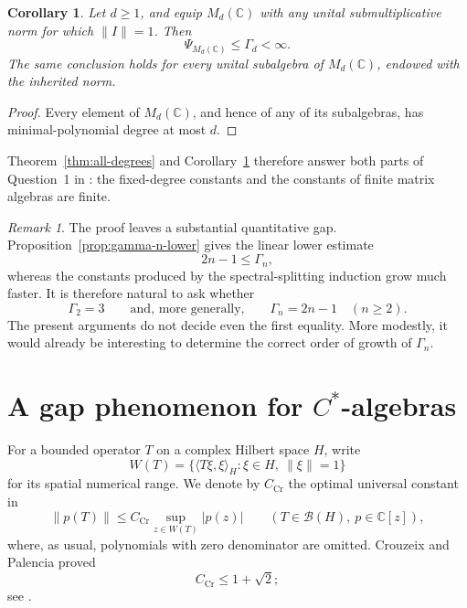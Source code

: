 \documentclass[a4paper]{amsart}
\newtheorem{corollary}[theorem]{Corollary}
\theoremstyle{remark}
\newtheorem{remark}[theorem]{Remark}
\newcommand{\C}{\mathbb C}
\newcommand{\calB}{\mathcal B}
\begin{document}
\begin{corollary}\label{cor:matrix-algebras}
Let \(d\geqslant1\), and equip \(M_d(\C)\) with any unital submultiplicative norm for which \(\|I\|=1\).  Then
\[
       \Psi_{M_d(\C)}\leqslant\Gamma_d<\infty.
\]
The same conclusion holds for every unital subalgebra of \(M_d(\C)\),
endowed with the inherited norm.
\end{corollary}

\begin{proof}
Every element of \(M_d(\C)\), and hence of any of its subalgebras, has minimal-polynomial degree at most \(d\).
\end{proof}

Theorem~\ref{thm:all-degrees} and Corollary~\ref{cor:matrix-algebras} therefore answer both parts of Question~1 in \cite[Section~8]{BHDVW}: the fixed-degree constants and the constants of finite matrix algebras are finite.

\begin{remark}\label{rem:quantitative-gap}
The proof leaves a substantial quantitative gap.  Proposition~\ref{prop:gamma-n-lower}
gives the linear lower estimate
\[
       2n-1\leqslant\Gamma_n,
\]
whereas the constants produced by the spectral-splitting induction grow much
faster.  It is therefore natural to ask whether
\[
       \Gamma_2=3
       \qquad\text{and, more generally,}\qquad
       \Gamma_n=2n-1\quad(n\geqslant2).
\]
The present arguments do not decide even the first equality.  More modestly,
it would already be interesting to determine the correct order of growth of
\(\Gamma_n\).
\end{remark}

\section{A gap phenomenon for \texorpdfstring{\(C^*\)}{C-star}-algebras}\label{sec:cstar-gap}

For a bounded operator \(T\) on a complex Hilbert space \(H\), write
\[
       W(T)=\{\langle T\xi,\xi\rangle_H:\xi\in H,\ \|\xi\|=1\}
\]
for its spatial numerical range.  We denote by \(C_{\mathrm{Cr}}\) the optimal
universal constant in
\[
       \|p(T)\|\leqslant C_{\mathrm{Cr}}
       \sup_{z\in W(T)}|p(z)|
       \qquad(T\in\calB(H),\ p\in\C[z]),
\]
where, as usual, polynomials with zero denominator are omitted.  Crouzeix and
Palencia proved
\begin{equation}\label{eq:crouzeix-palencia}
       C_{\mathrm{Cr}}\leqslant1+\sqrt2;
\end{equation}
see \cite[Theorem~3.1 and formula~(3)]{CrouzeixPalencia}.
\end{document}
